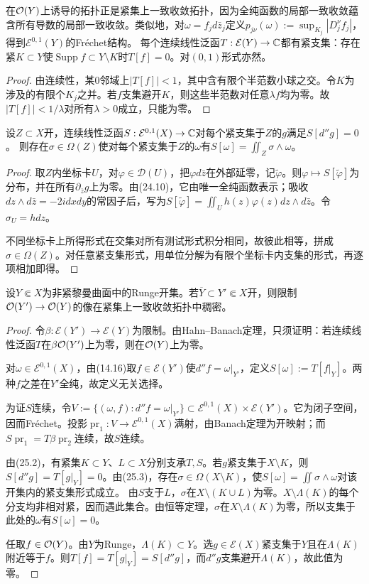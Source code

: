 在$\mathcal O(Y)$上诱导的拓扑正是紧集上一致收敛拓扑，因为全纯函数的局部一致收敛蕴含所有导数的局部一致收敛。类似地，对$\omega=f_jd\bar z_j$定义$p_{j\nu}(\omega):=\sup_{K_j}|D_j^\nu f_j|$，得到$\mathcal E^{0,1}(Y)$的Fréchet结构。
每个连续线性泛函$T:\mathcal E(Y)\to\mathbb C$都有紧支集：存在紧$K\subset Y$使$\operatorname{Supp}f\subset Y\setminus K$时$T[f]=0$。对$(0,1)$形式亦然。
\begin{proof}
由连续性，某0邻域上$|T[f]|<1$，其中含有限个半范数小球之交。令$K$为涉及的有限个$K_j$之并。若$f$支集避开$K$，则这些半范数对任意$\lambda f$均为零。故$|T[f]|<1/\lambda$对所有$\lambda>0$成立，只能为零。
\end{proof}
设$Z\subset X$开，连续线性泛函$S:\mathcal E^{0,1}(X)\to\mathbb C$对每个紧支集于$Z$的$g$满足$S[d''g]=0$。
则存在$\sigma\in\Omega(Z)$使对每个紧支集于$Z$的$\omega$有$S[\omega]=\iint_Z\sigma\wedge\omega$。
\begin{proof}
取$Z$内坐标卡$U$，对$\varphi\in\mathcal D(U)$，把$\varphi d\bar z$在外部延零，记$\widetilde\varphi$。则$\varphi\mapsto S[\widetilde\varphi]$为分布，并在所有$\partial_{\bar z}g$上为零。由(24.10)，它由唯一全纯函数表示；吸收$dz\wedge d\bar z=-2i dxdy$的常因子后，写为$S[\widetilde\varphi]=\iint_Uh(z)\varphi(z)dz\wedge d\bar z$。令$\sigma_U=h dz$。

不同坐标卡上所得形式在交集对所有测试形式积分相同，故彼此相等，拼成$\sigma\in\Omega(Z)$。对任意紧支集形式，用单位分解为有限个坐标卡内支集的形式，再逐项相加即得。
\end{proof}
设$Y\Subset X$为非紧黎曼曲面中的Runge开集。若$\overline Y\subset Y'\Subset X$开，则限制$\mathcal O(Y')\to\mathcal O(Y)$的像在紧集上一致收敛拓扑中稠密。
\begin{proof}
令$\beta:\mathcal E(Y')\to\mathcal E(Y)$为限制。由Hahn--Banach定理，只须证明：若连续线性泛函$T$在$\beta\mathcal O(Y')$上为零，则在$\mathcal O(Y)$上为零。

对$\omega\in\mathcal E^{0,1}(X)$，由(14.16)取$f\in\mathcal E(Y')$使$d''f=\omega|_{Y'}$，定义$S[\omega]:=T[f|_Y]$。两种$f$之差在$Y'$全纯，故定义无关选择。

为证$S$连续，令$V:=\{(\omega,f):d''f=\omega|_{Y'}\}\subset\mathcal E^{0,1}(X)\times\mathcal E(Y')$。它为闭子空间，因而Fréchet。投影$\operatorname{pr}_1:V\to\mathcal E^{0,1}(X)$满射，由Banach定理为开映射；而$S\operatorname{pr}_1=T\beta\operatorname{pr}_2$连续，故$S$连续。

由(25.2)，有紧集$K\subset Y$、$L\subset X$分别支承$T,S$。若$g$紧支集于$X\setminus K$，则$S[d''g]=T[g|_Y]=0$。由(25.3)，存在$\sigma\in\Omega(X\setminus K)$，使$S[\omega]=\iint\sigma\wedge\omega$对该开集内的紧支集形式成立。
由$S$支于$L$，$\sigma$在$X\setminus(K\cup L)$为零。$X\setminus\Lambda(K)$的每个分支均非相对紧，因而遇此集合。由恒等定理，$\sigma$在$X\setminus\Lambda(K)$为零，所以支集于此处的$\omega$有$S[\omega]=0$。

任取$f\in\mathcal O(Y)$。由$Y$为Runge，$\Lambda(K)\subset Y$。选$g\in\mathcal E(X)$紧支集于$Y$且在$\Lambda(K)$附近等于$f$。则$T[f]=T[g|_Y]=S[d''g]$，而$d''g$支集避开$\Lambda(K)$，故此值为零。
\end{proof}
